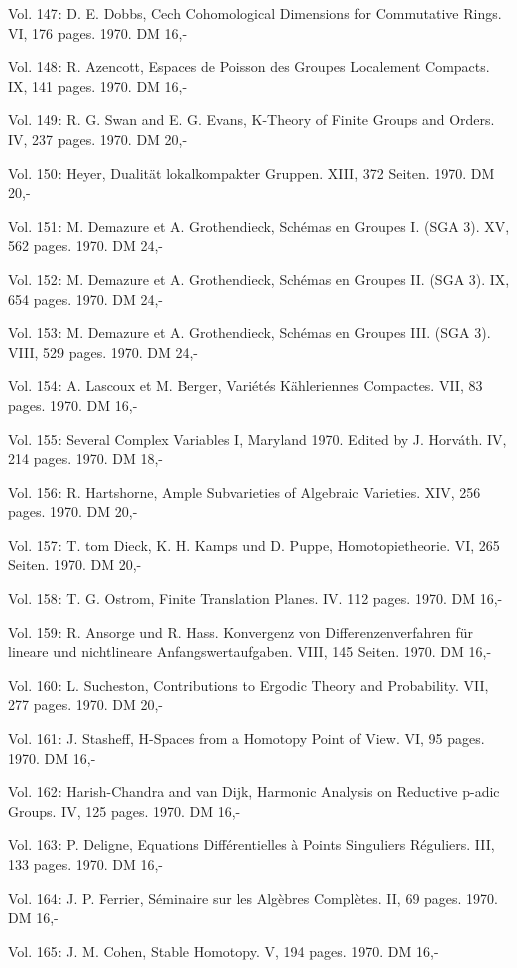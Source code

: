 Vol. 147: D. E. Dobbs, Cech Cohomological Dimensions for Commutative Rings. VI, 176 pages. 1970. DM 16,-

Vol. 148: R. Azencott, Espaces de Poisson des Groupes Localement Compacts. IX, 141 pages. 1970. DM 16,-

Vol. 149: R. G. Swan and E. G. Evans, K-Theory of Finite Groups and Orders. IV, 237 pages. 1970. DM 20,-

Vol. 150: Heyer, Dualität lokalkompakter Gruppen. XIII, 372 Seiten. 1970. DM 20,-

Vol. 151: M. Demazure et A. Grothendieck, Schémas en Groupes I. (SGA 3). XV, 562 pages. 1970. DM 24,-

Vol. 152: M. Demazure et A. Grothendieck, Schémas en Groupes II. (SGA 3). IX, 654 pages. 1970. DM 24,-

Vol. 153: M. Demazure et A. Grothendieck, Schémas en Groupes III. (SGA 3). VIII, 529 pages. 1970. DM 24,-

Vol. 154: A. Lascoux et M. Berger, Variétés Kähleriennes Compactes. VII, 83 pages. 1970. DM 16,-

Vol. 155: Several Complex Variables I, Maryland 1970. Edited by J. Horváth. IV, 214 pages. 1970. DM 18,-

Vol. 156: R. Hartshorne, Ample Subvarieties of Algebraic Varieties. XIV, 256 pages. 1970. DM 20,-

Vol. 157: T. tom Dieck, K. H. Kamps und D. Puppe, Homotopietheorie. VI, 265 Seiten. 1970. DM 20,-

Vol. 158: T. G. Ostrom, Finite Translation Planes. IV. 112 pages. 1970. DM 16,-

Vol. 159: R. Ansorge und R. Hass. Konvergenz von Differenzenverfahren für lineare und nichtlineare Anfangswertaufgaben. VIII, 145 Seiten. 1970. DM 16,-

Vol. 160: L. Sucheston, Contributions to Ergodic Theory and Probability. VII, 277 pages. 1970. DM 20,-

Vol. 161: J. Stasheff, H-Spaces from a Homotopy Point of View. VI, 95 pages. 1970. DM 16,-

Vol. 162: Harish-Chandra and van Dijk, Harmonic Analysis on Reductive p-adic Groups. IV, 125 pages. 1970. DM 16,-

Vol. 163: P. Deligne, Equations Différentielles à Points Singuliers Réguliers. III, 133 pages. 1970. DM 16,-

Vol. 164: J. P. Ferrier, Séminaire sur les Algèbres Complètes. II, 69 pages. 1970. DM 16,-

Vol. 165: J. M. Cohen, Stable Homotopy. V, 194 pages. 1970. DM 16,-

